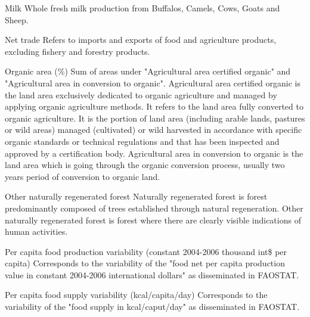 \begin{MetadataCollection} {}
\begin{metadata}{Milk} {}
Whole fresh milk production from Buffalos, Camels, Cows, Goats and Sheep.
\end{metadata}

\begin{metadata}{Net trade} {}
Refers to imports and exports of food and agriculture products, excluding fishery and forestry products. 
\end{metadata}


\begin{metadata}{Organic area (\%)} {}
Sum of areas under "Agricultural area certified organic" and "Agricultural area in conversion to organic". Agricultural area certified organic is the land area exclusively dedicated to organic agriculture and managed by applying organic agriculture methods. It refers to the land area fully converted to organic agriculture. It is the portion of land area (including arable lands, pastures or wild areas) managed (cultivated) or wild harvested in accordance with specific organic standards or technical regulations and that has been inspected and approved by a certification body. Agricultural area in conversion to organic is the land area which is going through the organic conversion process, usually two years period of conversion to organic land.
\end{metadata}

\begin{metadata}{Other naturally regenerated forest} {}
Naturally regenerated forest is forest predominantly composed of trees established through natural regeneration. Other naturally regenerated forest is forest where there are clearly visible indications of human activities.
\end{metadata}

\begin{metadata}{Per capita food production variability (constant 2004-2006 thousand int\$ per capita)} {}
Corresponds to the variability of the "food net per capita production value in constant 2004-2006 international dollars" as disseminated in FAOSTAT.
\end{metadata}

\begin{metadata}{Per capita food supply variability (kcal/capita/day)} {}
Corresponds to the variability of the "food supply in kcal/caput/day" as disseminated in FAOSTAT.
\end{metadata}


\end{MetadataCollection}
